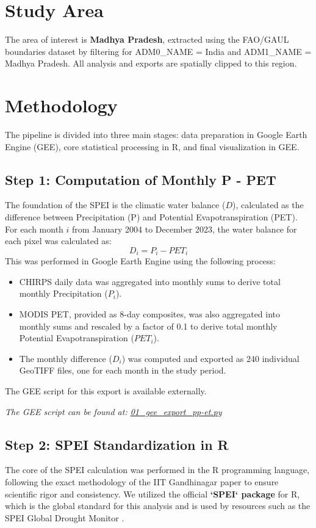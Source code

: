 \documentclass[12pt, a4paper]{article}
\begin{document}
\section{Study Area}
The area of interest is \textbf{Madhya Pradesh}, extracted using the FAO/GAUL boundaries dataset \cite{fao2015gaul} by filtering for ADM0\_NAME = India and ADM1\_NAME = Madhya Pradesh. All analysis and exports are spatially clipped to this region.

\section{Methodology}
The pipeline is divided into three main stages: data preparation in Google Earth Engine (GEE), core statistical processing in R, and final visualization in GEE.

\subsection{Step 1: Computation of Monthly P - PET}
The foundation of the SPEI is the climatic water balance ($D$), calculated as the difference between Precipitation (P) and Potential Evapotranspiration (PET). For each month $i$ from January 2004 to December 2023, the water balance for each pixel was calculated as:
\[ D_i = P_i - PET_i \]
This was performed in Google Earth Engine using the following process:
\begin{itemize}
    \item CHIRPS daily data was aggregated into monthly sums to derive total monthly Precipitation ($P_i$).
    \item MODIS PET, provided as 8-day composites, was also aggregated into monthly sums and rescaled by a factor of 0.1 to derive total monthly Potential Evapotranspiration ($PET_i$).
    \item The monthly difference ($D_i$) was computed and exported as 240 individual GeoTIFF files, one for each month in the study period.
\end{itemize}
The GEE script for this export is available externally.
\begin{center}
    \textit{The GEE script can be found at: \href{https://github.com/Actuallyanonymous/spei-drought-analysis-pipeline/blob/main/scripts/01_gee_export_pp-et.py}{01\_gee\_export\_pp-et.py}}
\end{center}

\subsection{Step 2: SPEI Standardization in R}
The core of the SPEI calculation was performed in the R programming language, following the exact methodology of the IIT Gandhinagar paper \cite{mishra2023spei} to ensure scientific rigor and consistency. We utilized the official \textbf{`SPEI` package} for R, which is the global standard for this analysis and is used by resources such as the SPEI Global Drought Monitor \cite{spei_csic}.
\end{document}
